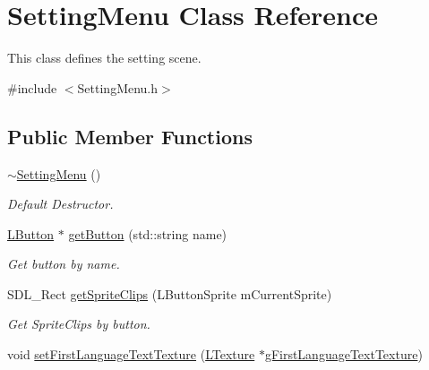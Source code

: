 \hypertarget{class_setting_menu}{}\section{Setting\+Menu Class Reference}
\label{class_setting_menu}


This class defines the setting scene.  




{\ttfamily \#include $<$Setting\+Menu.\+h$>$}

\subsection*{Public Member Functions}
\begin{DoxyCompactItemize}
\item 
\mbox{\label{class_setting_menu_a6d92ac4ff9519e6cb55da5d6e9709e16}} 
\mbox{\hyperlink{class_setting_menu_a6d92ac4ff9519e6cb55da5d6e9709e16}{$\sim$\+Setting\+Menu}} ()
\begin{DoxyCompactList}\small\item\em Default Destructor. \end{DoxyCompactList}\item 
\mbox{\label{class_setting_menu_a473b6560b580c8cc7aa036e264f7c114}} 
\mbox{\hyperlink{class_l_button}{L\+Button}} $\ast$ \mbox{\hyperlink{class_setting_menu_a473b6560b580c8cc7aa036e264f7c114}{get\+Button}} (std\+::string name)
\begin{DoxyCompactList}\small\item\em Get button by name. \end{DoxyCompactList}\item 
\mbox{\label{class_setting_menu_a9ccb11089ba1aa39937e101e4156be22}} 
S\+D\+L\+\_\+\+Rect \mbox{\hyperlink{class_setting_menu_a9ccb11089ba1aa39937e101e4156be22}{get\+Sprite\+Clips}} (L\+Button\+Sprite m\+Current\+Sprite)
\begin{DoxyCompactList}\small\item\em Get Sprite\+Clips by button. \end{DoxyCompactList}\item 
\mbox{\label{class_setting_menu_aaeba1706305bbd49a06de7d9ba1226d0}} 
void \mbox{\hyperlink{class_setting_menu_aaeba1706305bbd49a06de7d9ba1226d0}{set\+First\+Language\+Text\+Texture}} (\mbox{\hyperlink{class_l_texture}{L\+Texture}} $\ast$\mbox{\hyperlink{class_setting_menu_a5a749d9f59f41edca75ed98cb7babf67}{g\+First\+Language\+Text\+Texture}})

\end{DoxyCompactItemize}

